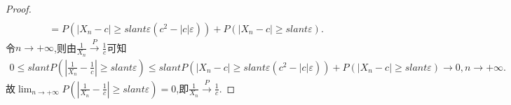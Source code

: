 \documentclass[lang=cn,newtx,10pt,scheme=chinese]{../../Template/elegantbook}
\begin{document}
\begin{proof}
\begin{align*}
    \\
    &= P\left(\left|X_n - c\right| \geqslant slant \varepsilon(c^2 - |c|\varepsilon)\right) + P\left(\left|X_n - c\right| \geqslant slant \varepsilon\right).
\end{align*}
令\(n \to +\infty\),则由\(\frac{1}{X_n} \overset{P}{\rightarrow} \frac{1}{c}\)可知
\begin{align*}
   0 \leqslant slant P\left(\left|\frac{1}{X_n} - \frac{1}{c}\right| \geqslant slant \varepsilon\right) \leqslant slant P\left(\left|X_n - c\right| \geqslant slant \varepsilon(c^2 - |c|\varepsilon)\right) + P\left(\left|X_n - c\right| \geqslant slant \varepsilon\right) \to 0,n \to +\infty .
\end{align*}
故\(\lim_{n \to +\infty}P\left(\left|\frac{1}{X_n} - \frac{1}{c}\right| \geqslant slant \varepsilon\right) = 0\),即\(\frac{1}{X_n} \overset{P}{\rightarrow} \frac{1}{c}\).
\end{proof}
\end{document}
